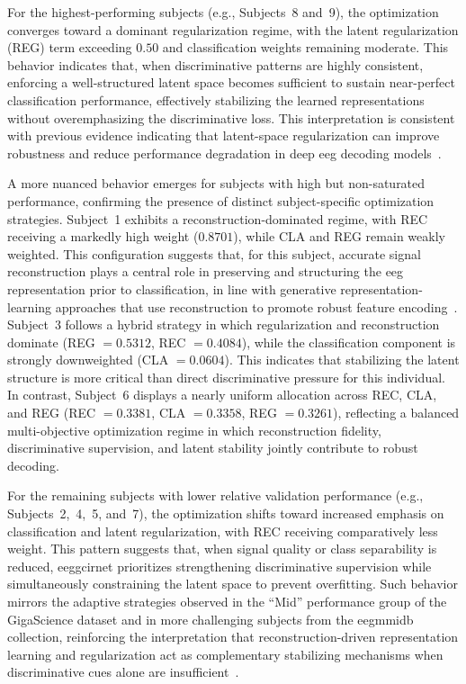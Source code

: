 For the highest-performing subjects (e.g., Subjects~8 and~9), the optimization converges toward a dominant regularization regime, with the latent regularization (REG) term exceeding $0.50$ and classification weights remaining moderate. This behavior indicates that, when discriminative patterns are highly consistent, enforcing a well-structured latent space becomes sufficient to sustain near-perfect classification performance, effectively stabilizing the learned representations without overemphasizing the discriminative loss. This interpretation is consistent with previous evidence indicating that latent-space regularization can improve robustness and reduce performance degradation in deep \gls{eeg} decoding models~\cite{10483787,Dhanushkodi}.

A more nuanced behavior emerges for subjects with high but non-saturated performance, confirming the presence of distinct subject-specific optimization strategies. Subject~1 exhibits a reconstruction-dominated regime, with REC receiving a markedly high weight ($0.8701$), while CLA and REG remain weakly weighted. This configuration suggests that, for this subject, accurate signal reconstruction plays a central role in preserving and structuring the \gls{eeg} representation prior to classification, in line with generative representation-learning approaches that use reconstruction to promote robust feature encoding~\cite{Dhanushkodi}. Subject~3 follows a hybrid strategy in which regularization and reconstruction dominate (REG $=0.5312$, REC $=0.4084$), while the classification component is strongly downweighted (CLA $=0.0604$). This indicates that stabilizing the latent structure is more critical than direct discriminative pressure for this individual. In contrast, Subject~6 displays a nearly uniform allocation across REC, CLA, and REG (REC $=0.3381$, CLA $=0.3358$, REG $=0.3261$), reflecting a balanced multi-objective optimization regime in which reconstruction fidelity, discriminative supervision, and latent stability jointly contribute to robust decoding.

For the remaining subjects with lower relative validation performance (e.g., Subjects~2,~4,~5, and~7), the optimization shifts toward increased emphasis on classification and latent regularization, with REC receiving comparatively less weight. This pattern suggests that, when signal quality or class separability is reduced, \gls{eeggcirnet} prioritizes strengthening discriminative supervision while simultaneously constraining the latent space to prevent overfitting. Such behavior mirrors the adaptive strategies observed in the ``Mid'' performance group of the GigaScience dataset and in more challenging subjects from the \gls{eegmmidb} collection, reinforcing the interpretation that reconstruction-driven representation learning and regularization act as complementary stabilizing mechanisms when discriminative cues alone are insufficient~\cite{10483787,Dhanushkodi}.

